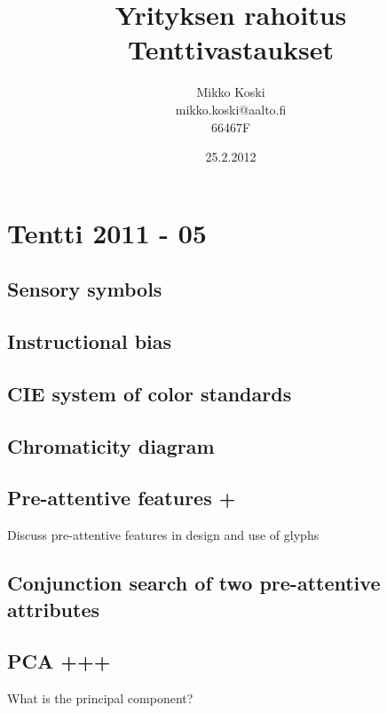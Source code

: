 \documentclass[a4paper]{article}
\begin{document}
\title{\small Yrityksen rahoitus \\ \huge Tenttivastaukset}
\date{25.2.2012}
\author{Mikko Koski \\ mikko.koski@aalto.fi \\ 66467F}
\maketitle

\normalsize
\setlength{\parindent}{0cm}

\section{Tentti 2011 - 05}

\subsection{Sensory symbols}

\subsection{Instructional bias}

\subsection{CIE system of color standards}

\subsection{Chromaticity diagram}

\subsection{Pre-attentive features +}

Discuss pre-attentive features in design and use of glyphs

\subsection{Conjunction search of two pre-attentive attributes}

\subsection{PCA +++}

What is the principal component?
\end{document}
